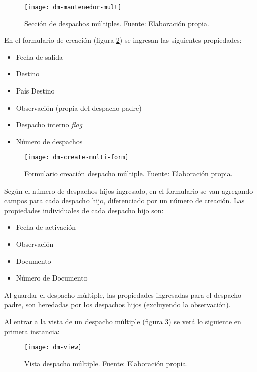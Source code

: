 \begin{figure}[H]
	\centering
	\texttt{[image: dm-mantenedor-mult]}
	\caption{\label{fig:dm-mantenedor-mult} Sección de despachos múltiples. Fuente: Elaboración propia.}
\end{figure}

En el formulario de creación (figura \ref{fig:dm-create-multi-form}) se ingresan las siguientes propiedades:
\begin{itemize}
    \item Fecha de salida
    \item Destino
    \item País Destino
    \item Observación (propia del despacho padre)
    \item Despacho interno \textit{flag}    
    \item Número de despachos
\end{itemize}

\begin{figure}[H]
	\centering
	\texttt{[image: dm-create-multi-form]}
	\caption{\label{fig:dm-create-multi-form} Formulario creación despacho múltiple. Fuente: Elaboración propia.}
\end{figure}

Según el número de despachos hijos ingresado, en el formulario se van agregando campos para cada despacho hijo, diferenciado por un número de creación. Las propiedades individuales de cada despacho hijo son:
\begin{itemize}
    \item Fecha de activación
    \item Observación
    \item Documento
    \item Número de Documento
\end{itemize}

Al guardar el despacho múltiple, las propiedades ingresadas para el despacho padre, son heredadas por los despachos hijos (excluyendo la observación).

Al entrar a la vista de un despacho múltiple (figura \ref{fig:dm-view}) se verá lo siguiente en primera instancia:

\begin{figure}[H]
	\centering
	\texttt{[image: dm-view]}
	\caption{\label{fig:dm-view} Vista despacho múltiple. Fuente: Elaboración propia.}
\end{figure}

